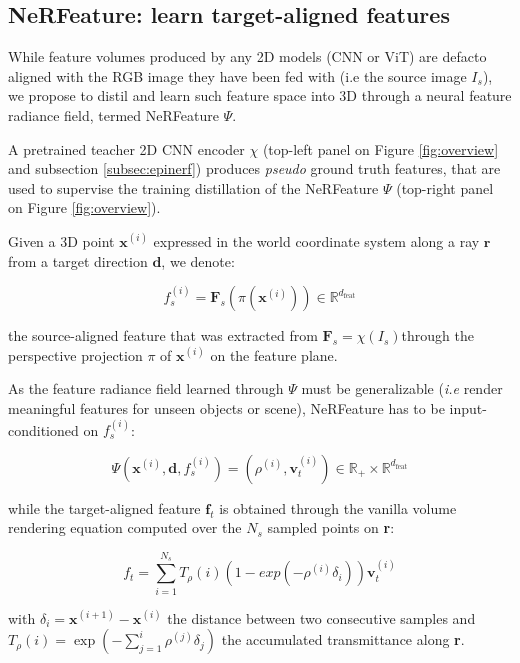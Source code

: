 \subsection{NeRFeature: learn target-aligned features}
\label{subsec:nerfeature}

While feature volumes produced by any 2D models (CNN or ViT) are defacto aligned with the RGB image they have been fed with (i.e the source image $I_s$), we propose to distil and learn such feature space into 3D through a neural feature radiance field, termed NeRFeature $\Psi$. 

A pretrained teacher 2D CNN encoder $\chi$ (top-left panel on Figure \ref{fig:overview} and subsection \ref{subsec:epinerf}) produces \textit{pseudo} ground truth features, that are used to supervise the training distillation of the NeRFeature $\Psi$ (top-right panel on Figure \ref{fig:overview}).

Given a 3D point $\mathbf{x}^{(i)}$ expressed in the world coordinate system along a ray $\mathbf{r}$ from a target direction $\mathbf{d}$, we denote: 

\begin{equation}
    f_{s}^{(i)} = \mathbf{F}_{s}(\pi(\mathbf{x}^{(i)}))  \in \mathbb{R}^{d_{\text{feat}}} 
    \label{eq:projection}
\end{equation}

the source-aligned feature that was extracted from $\mathbf{F}_{s}=\chi(I_{s})$through the perspective projection $\pi$ of $\mathbf{x}^{(i)}$ on the feature plane.

As the feature radiance field learned through $\Psi$ must be generalizable (\textit{i.e} render meaningful features for unseen objects or scene), NeRFeature has to be input-conditioned on $f_{s}^{(i)}$: 

\begin{equation}
    \Psi(\mathbf{x}^{(i)},\mathbf{d},f_{s}^{(i)}) = (\rho^{(i)},\mathbf{v}_{t}^{(i)}) \in \mathbb{R}_{+}\times \mathbb{R}^{d_{\text{feat}}}
\end{equation}

while the target-aligned feature $\mathbf{f}_{t}$ is obtained through the vanilla volume rendering equation computed over the $N_s$ sampled points on \textbf{r}: 

\begin{equation}
    f_{t} = \sum_{i=1}^{N_{s}} T_{\rho}(i)(1-exp(-\rho^{(i)}\delta_{i}))\mathbf{v}_{t}^{(i)}
\end{equation}

with $\delta_{i}=\mathbf{x}^{(i+1)}-\mathbf{x}^{(i)}$  the distance between two consecutive samples and $T_{\rho}(i) = \exp\left(-\sum_{j=1}^{i}\rho^{(j)}\delta_{j}\right)$ the accumulated transmittance along \textbf{r}.

